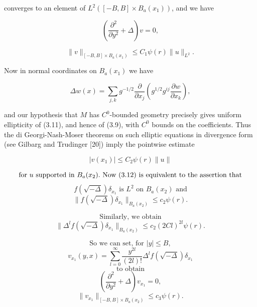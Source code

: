 converges to an element of $L^2([-B,B]\times B_a(x_1))$, and we have

\begin{equation}\tag{3.9}
\left(\frac{\partial^2}{\partial y^2}+\Delta\right)v=0,
\end{equation}

\begin{equation}\tag{3.10}
\|v\|_{[-B,B]\times B_a(x_1)}\le C_1\psi(r)\|u\|_{L^2}.
\end{equation}

Now in normal coordinates on $B_a(x_1)$ we have

\begin{equation}\tag{3.11}
\Delta w(x)=\sum_{j,k} g^{-1/2}\frac{\partial}{\partial x_j}
\left(g^{1/2}g^{ij}\frac{\partial w}{\partial x_k}\right),
\end{equation}

and our hypothesis that $M$ has $C^0$-bounded geometry precisely gives uniform ellipticity of (3.11), and hence of (3.9), with $C^0$ bounds on the coefficients. Thus the di Georgi-Nash-Moser theorems on such elliptic equations in divergence form (see Gilbarg and Trudinger [20]) imply the pointwise estimate

\begin{equation}\tag{3.12}
|v(x_1)|\le C_2\psi(r)\|u\|
\end{equation}

\[
\text{for }u\text{ supported in }B_a(x_2).\ \text{Now }(3.12)\text{ is equivalent to the assertion that}
\]
\[
f(\sqrt{-\Delta})\delta_{x_1}\text{ is }L^2\text{ on }B_a(x_2)\text{ and}
\]
\begin{equation}\tag{3.13}
 \bigl\|f(\sqrt{-\Delta})\delta_{x_1}\bigr\|_{B_a(x_2)}\le c_2\psi(r).
\end{equation}

\[
\text{Similarly, we obtain}
\]
\begin{equation}\tag{3.14}
 \bigl\|\Delta^l f(\sqrt{-\Delta})\delta_{x_1}\bigr\|_{B_a(x_2)}\le c_2(2Cl)^{2l}\psi(r).
\end{equation}

\[
\text{So we can set, for }|y|\le B,
\]
\begin{equation}\tag{3.15}
 v_{x_1}(y,x)=\sum_{l=0}^{\infty}\frac{y^{2l}}{(2l)!}\Delta^l f(\sqrt{-\Delta})\delta_{x_1}
\end{equation}
\[
\text{to obtain}
\]
\begin{equation}\tag{3.16}
 \left(\frac{\partial^2}{\partial y^2}+\Delta\right)v_{x_1}=0,
\end{equation}
\begin{equation}\tag{3.17}
 \bigl\|v_{x_1}\bigr\|_{[-B,B]\times B_a(x_2)}\le c_3\psi(r).
\end{equation}

